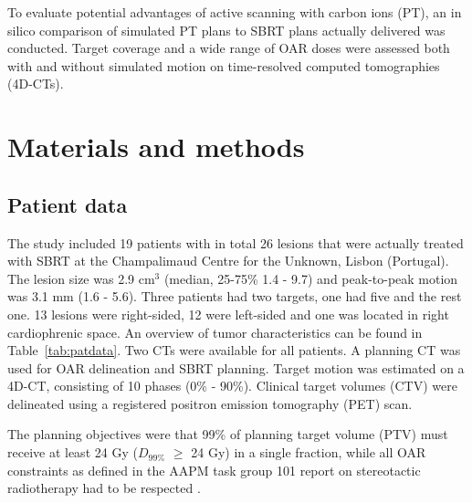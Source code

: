 To evaluate potential advantages of active scanning with carbon ions (PT), an in silico comparison of simulated PT plans to 
SBRT plans actually delivered was conducted. Target coverage and a wide range of OAR doses were assessed both with and without simulated motion on time-resolved computed tomographies (4D-CTs).



\section{Materials and methods}

\subsection{Patient data}

The study included 19 patients with in total 26 lesions that were actually treated with SBRT at the Champalimaud Centre for the Unknown, Lisbon (Portugal). The lesion size was 2.9 cm$^3$ (median, 25-75\% 1.4 - 9.7) and peak-to-peak motion was 3.1 mm (1.6 - 5.6). Three patients had two targets, one had five and the rest one. 13 lesions were right-sided, 12 were left-sided and one was located in right cardiophrenic space. An overview of tumor characteristics can be found in Table~\ref{tab:patdata}.
Two CTs were available for all patients. A planning CT was used for OAR delineation and SBRT planning. Target motion was estimated on a 4D-CT, consisting of 10 phases (0\% - 90\%). Clinical target volumes (CTV) were delineated using a registered positron emission tomography (PET) scan.

The planning objectives were that 99\% of planning target volume (PTV) must receive at least 24 Gy ($D_{99\%}$ $\geq$ 24 Gy) in a single fraction, while all OAR constraints as defined in the AAPM task group 101 report on stereotactic radiotherapy had to be respected \cite{Benedict2010}.


